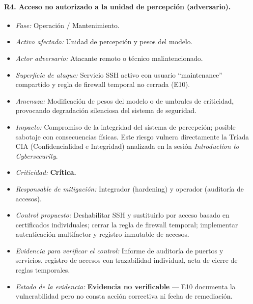 \documentclass[11pt]{article}
\begin{document}
\paragraph{R4. Acceso no autorizado a la unidad de percepción (adversario).}
\begin{itemize}[nosep]
    \item \textit{Fase:} Operación / Mantenimiento.
    \item \textit{Activo afectado:} Unidad de percepción y pesos del modelo.
    \item \textit{Actor adversario:} Atacante remoto o técnico malintencionado.
    \item \textit{Superficie de ataque:} Servicio SSH activo con usuario ``maintenance'' compartido y regla de firewall temporal no cerrada (E10).
    \item \textit{Amenaza:} Modificación de pesos del modelo o de umbrales de criticidad, provocando degradación silenciosa del sistema de seguridad.
    \item \textit{Impacto:} Compromiso de la integridad del sistema de percepción; posible sabotaje con consecuencias físicas. Este riesgo vulnera directamente la Tríada CIA (Confidencialidad e Integridad) analizada en la sesión \textit{Introduction to Cybersecurity}.
    \item \textit{Criticidad:} \textbf{Crítica.}
    \item \textit{Responsable de mitigación:} Integrador (hardening) y operador (auditoría de accesos).
    \item \textit{Control propuesto:} Deshabilitar SSH y sustituirlo por acceso basado en certificados individuales; cerrar la regla de firewall temporal; implementar autenticación multifactor y registro inmutable de accesos.
    \item \textit{Evidencia para verificar el control:} Informe de auditoría de puertos y servicios, registro de accesos con trazabilidad individual, acta de cierre de reglas temporales.
    \item \textit{Estado de la evidencia:} \textbf{Evidencia no verificable} --- E10 documenta la vulnerabilidad pero no consta acción correctiva ni fecha de remediación.
\end{itemize}
\end{document}
